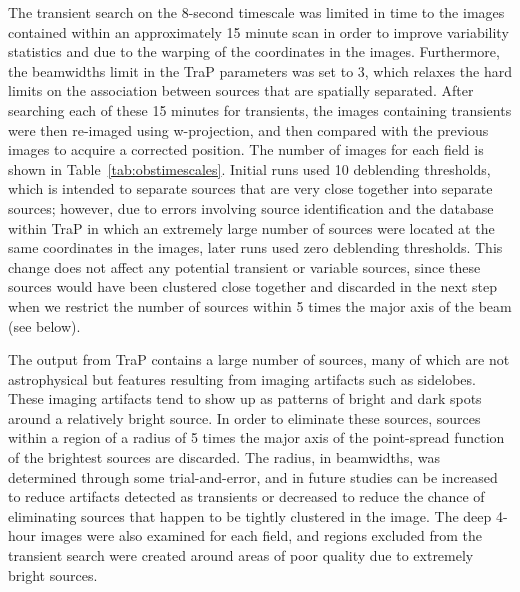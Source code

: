 \documentclass[12pt]{article}
\begin{document}
The transient search on the 8-second timescale was limited in time to the images contained within an approximately 15 minute scan in order to improve variability statistics and due to the warping of the coordinates in the images. Furthermore, the beamwidths limit in the TraP parameters was set to 3, which relaxes the hard limits on the association between sources that are spatially separated. After searching each of these 15 minutes for transients, the images containing transients were then re-imaged using w-projection, and then compared with the previous images to acquire a corrected position. The number of images for each field is shown in Table~\ref{tab:obstimescales}. Initial runs used 10 deblending thresholds, which is intended to separate sources that are very close together into separate sources; however, due to errors involving source identification and the database within TraP in which an extremely large number of sources were located at the same coordinates in the images, later runs used zero deblending thresholds. This change does not affect any potential transient or variable sources, since these sources would have been clustered close together and discarded in the next step when we restrict the number of sources within 5 times the major axis of the beam (see below).

The output from TraP contains a large number of sources, many of which are not astrophysical but features resulting from imaging artifacts such as sidelobes. These imaging artifacts tend to show up as patterns of bright and dark spots around a relatively bright source. In order to eliminate these sources, sources within a region of a radius of 5 times the major axis of the point-spread function of the brightest sources are discarded. The radius, in beamwidths, was determined through some trial-and-error, and in future studies can be increased to reduce artifacts detected as transients or decreased to reduce the chance of eliminating sources that happen to be tightly clustered in the image. The deep 4-hour images were also examined for each field, and regions excluded from the transient search were created around areas of poor quality due to extremely bright sources. 
\end{document}
